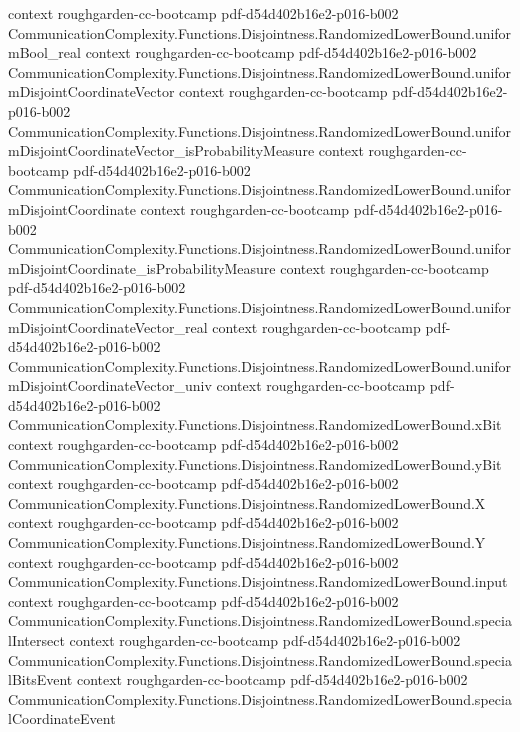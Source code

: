 \begin{theorem}
  {context}
  {roughgarden-cc-bootcamp}
  {pdf-d54d402b16e2-p016-b002}
\proofstep
  {CommunicationComplexity.Functions.Disjointness.RandomizedLowerBound.uniformBool_real}
  {context}
  {roughgarden-cc-bootcamp}
  {pdf-d54d402b16e2-p016-b002}
\proofstep
  {CommunicationComplexity.Functions.Disjointness.RandomizedLowerBound.uniformDisjointCoordinateVector}
  {context}
  {roughgarden-cc-bootcamp}
  {pdf-d54d402b16e2-p016-b002}
\proofstep
  {CommunicationComplexity.Functions.Disjointness.RandomizedLowerBound.uniformDisjointCoordinateVector_isProbabilityMeasure}
  {context}
  {roughgarden-cc-bootcamp}
  {pdf-d54d402b16e2-p016-b002}
\proofstep
  {CommunicationComplexity.Functions.Disjointness.RandomizedLowerBound.uniformDisjointCoordinate}
  {context}
  {roughgarden-cc-bootcamp}
  {pdf-d54d402b16e2-p016-b002}
\proofstep
  {CommunicationComplexity.Functions.Disjointness.RandomizedLowerBound.uniformDisjointCoordinate_isProbabilityMeasure}
  {context}
  {roughgarden-cc-bootcamp}
  {pdf-d54d402b16e2-p016-b002}
\proofstep
  {CommunicationComplexity.Functions.Disjointness.RandomizedLowerBound.uniformDisjointCoordinateVector_real}
  {context}
  {roughgarden-cc-bootcamp}
  {pdf-d54d402b16e2-p016-b002}
\proofstep
  {CommunicationComplexity.Functions.Disjointness.RandomizedLowerBound.uniformDisjointCoordinateVector_univ}
  {context}
  {roughgarden-cc-bootcamp}
  {pdf-d54d402b16e2-p016-b002}
\proofstep
  {CommunicationComplexity.Functions.Disjointness.RandomizedLowerBound.xBit}
  {context}
  {roughgarden-cc-bootcamp}
  {pdf-d54d402b16e2-p016-b002}
\proofstep
  {CommunicationComplexity.Functions.Disjointness.RandomizedLowerBound.yBit}
  {context}
  {roughgarden-cc-bootcamp}
  {pdf-d54d402b16e2-p016-b002}
\proofstep
  {CommunicationComplexity.Functions.Disjointness.RandomizedLowerBound.X}
  {context}
  {roughgarden-cc-bootcamp}
  {pdf-d54d402b16e2-p016-b002}
\proofstep
  {CommunicationComplexity.Functions.Disjointness.RandomizedLowerBound.Y}
  {context}
  {roughgarden-cc-bootcamp}
  {pdf-d54d402b16e2-p016-b002}
\proofstep
  {CommunicationComplexity.Functions.Disjointness.RandomizedLowerBound.input}
  {context}
  {roughgarden-cc-bootcamp}
  {pdf-d54d402b16e2-p016-b002}
\proofstep
  {CommunicationComplexity.Functions.Disjointness.RandomizedLowerBound.specialIntersect}
  {context}
  {roughgarden-cc-bootcamp}
  {pdf-d54d402b16e2-p016-b002}
\proofstep
  {CommunicationComplexity.Functions.Disjointness.RandomizedLowerBound.specialBitsEvent}
  {context}
  {roughgarden-cc-bootcamp}
  {pdf-d54d402b16e2-p016-b002}
\proofstep
  {CommunicationComplexity.Functions.Disjointness.RandomizedLowerBound.specialCoordinateEvent}

\end{theorem}
